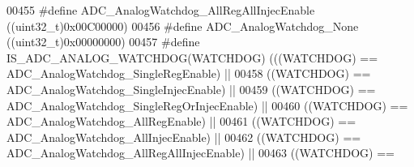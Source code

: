 \begin{DoxyCode}
00455 \textcolor{preprocessor}{#}\textcolor{preprocessor}{define} \textcolor{preprocessor}{ADC\_AnalogWatchdog\_AllRegAllInjecEnable}    \textcolor{preprocessor}{(}\textcolor{preprocessor}{(}\textcolor{preprocessor}{uint32\_t}\textcolor{preprocessor}{)}0x00C00000\textcolor{preprocessor}{)}
00456 \textcolor{preprocessor}{#}\textcolor{preprocessor}{define} \textcolor{preprocessor}{ADC\_AnalogWatchdog\_None}                    \textcolor{preprocessor}{(}\textcolor{preprocessor}{(}\textcolor{preprocessor}{uint32\_t}\textcolor{preprocessor}{)}0x00000000\textcolor{preprocessor}{)}
00457 \textcolor{preprocessor}{#}\textcolor{preprocessor}{define} \textcolor{preprocessor}{IS\_ADC\_ANALOG\_WATCHDOG}\textcolor{preprocessor}{(}\textcolor{preprocessor}{WATCHDOG}\textcolor{preprocessor}{)} \textcolor{preprocessor}{(}\textcolor{preprocessor}{(}\textcolor{preprocessor}{(}\textcolor{preprocessor}{WATCHDOG}\textcolor{preprocessor}{)} \textcolor{preprocessor}{==} 
      ADC_AnalogWatchdog_SingleRegEnable\textcolor{preprocessor}{)} \textcolor{preprocessor}{||}
00458                                           \textcolor{preprocessor}{(}\textcolor{preprocessor}{(}\textcolor{preprocessor}{WATCHDOG}\textcolor{preprocessor}{)} \textcolor{preprocessor}{==} 
      ADC_AnalogWatchdog_SingleInjecEnable\textcolor{preprocessor}{)} \textcolor{preprocessor}{||}
00459                                           \textcolor{preprocessor}{(}\textcolor{preprocessor}{(}\textcolor{preprocessor}{WATCHDOG}\textcolor{preprocessor}{)} \textcolor{preprocessor}{==} 
      ADC_AnalogWatchdog_SingleRegOrInjecEnable\textcolor{preprocessor}{)} \textcolor{preprocessor}{||}
00460                                           \textcolor{preprocessor}{(}\textcolor{preprocessor}{(}\textcolor{preprocessor}{WATCHDOG}\textcolor{preprocessor}{)} \textcolor{preprocessor}{==} 
      ADC_AnalogWatchdog_AllRegEnable\textcolor{preprocessor}{)} \textcolor{preprocessor}{||}
00461                                           \textcolor{preprocessor}{(}\textcolor{preprocessor}{(}\textcolor{preprocessor}{WATCHDOG}\textcolor{preprocessor}{)} \textcolor{preprocessor}{==} 
      ADC_AnalogWatchdog_AllInjecEnable\textcolor{preprocessor}{)} \textcolor{preprocessor}{||}
00462                                           \textcolor{preprocessor}{(}\textcolor{preprocessor}{(}\textcolor{preprocessor}{WATCHDOG}\textcolor{preprocessor}{)} \textcolor{preprocessor}{==} 
      ADC_AnalogWatchdog_AllRegAllInjecEnable\textcolor{preprocessor}{)} \textcolor{preprocessor}{||}
00463                                           \textcolor{preprocessor}{(}\textcolor{preprocessor}{(}\textcolor{preprocessor}{WATCHDOG}\textcolor{preprocessor}{)} \textcolor{preprocessor}{==} 

\end{DoxyCode}
